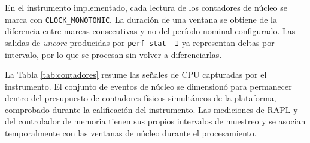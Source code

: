 \documentclass[12pt,oneside,spanish]{book}
\begin{document}
En el instrumento implementado, cada lectura de los contadores de núcleo se
marca con \texttt{CLOCK\_MONOTONIC}. La duración de una ventana se obtiene de la
diferencia entre marcas consecutivas y no del período nominal configurado. Las
salidas de \textit{uncore} producidas por \texttt{perf stat -I} ya representan
deltas por intervalo, por lo que se procesan sin volver a diferenciarlas.

La Tabla \ref{tab:contadores} resume las señales de CPU capturadas por el
instrumento. El conjunto de eventos de núcleo se dimensionó para permanecer
dentro del presupuesto de contadores físicos simultáneos de la plataforma,
comprobado durante la calificación del instrumento. Las mediciones de RAPL y
del controlador de memoria tienen sus propios intervalos de muestreo y se
asocian temporalmente con las ventanas de núcleo durante el procesamiento.
\end{document}
